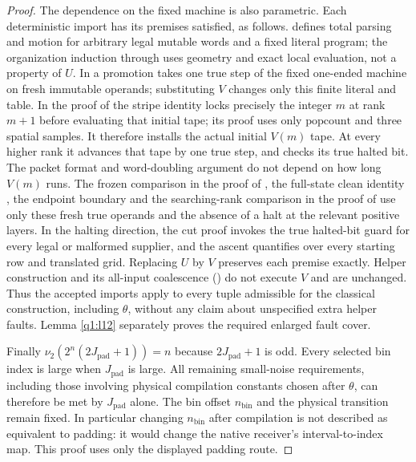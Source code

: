 \begin{proof}
The dependence on the fixed machine is also parametric. Each deterministic import has its premises satisfied, as follows. \cite[Section~\ref*{cl:sec:construction}]{DMNoise1D2026} defines total parsing and motion for arbitrary legal mutable words and a fixed literal program; the organization induction through \cite[Proposition~\ref*{cl:prop:organization}]{DMNoise1D2026} uses geometry and exact local evaluation, not a property of \(U\). In \cite[Section~\ref*{cl:sec:parameter}]{DMNoise1D2026} a promotion takes one true step of the fixed one-ended machine on fresh immutable operands; substituting \(V\) changes only this finite literal and table. In the proof of \cite[Lemma~\ref*{cl:lem:locking}]{DMNoise1D2026} the stripe identity locks precisely the integer \(m\) at rank \(m+1\) before evaluating that initial tape; its proof uses only \(\mathrm{popcount}\) and three spatial samples. It therefore installs the actual initial \(V(m)\) tape. At every higher rank it advances that tape by one true step, and checks its true halted bit. The packet format and word-doubling argument do not depend on how long \(V(m)\) runs. The frozen comparison in the proof of \cite[Lemma~\ref*{cl:lem:locking}]{DMNoise1D2026}, the full-state clean identity \cite[Lemma~\ref*{cl:lem:clean}]{DMNoise1D2026}, the endpoint boundary and the searching-rank comparison in the proof of \cite[Lemma~\ref*{cl:lem:past}]{DMNoise1D2026} use only these fresh true operands and the absence of a halt at the relevant positive layers. In the halting direction, the cut proof \cite[Lemma~\ref*{cl:lem:cap-cut}]{DMNoise1D2026} invokes the true halted-bit guard for every legal or malformed supplier, and the ascent \cite[Lemma~\ref*{cl:lem:ascent}]{DMNoise1D2026} quantifies over every starting row and translated grid. Replacing \(U\) by \(V\) preserves each premise exactly. Helper construction and its all-input coalescence (\cite[Sections~\ref*{cl:sec:embedding}--\ref*{cl:sec:stripes} and Lemmas~\ref*{cl:lem:receiver-mixing}--\ref*{cl:lem:stripes}]{DMNoise1D2026}) do not execute \(V\) and are unchanged. Thus the accepted imports apply to every tuple admissible for the classical construction, including \(\theta\), without any claim about unspecified extra helper faults. Lemma \ref{q1:l12} separately proves the required enlarged fault cover.

Finally \(\nu_{2}(2^{n}(2J_{\mathrm{pad}}+1))=n\) because \(2J_{\mathrm{pad}}+1\) is odd. Every selected bin index is large when \(J_{\mathrm{pad}}\) is large. All remaining small-noise requirements, including those involving physical compilation constants chosen after \(\theta\), can therefore be met by \(J_{\mathrm{pad}}\) alone. The bin offset \(n_{\mathrm{bin}}\) and the physical transition remain fixed. In particular changing \(n_{\mathrm{bin}}\) after compilation is not described as equivalent to padding: it would change the native receiver's interval-to-index map. This proof uses only the displayed padding route. 
\end{proof}



